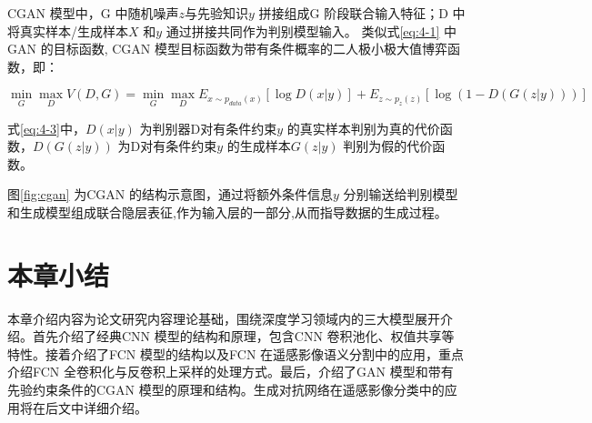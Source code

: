 CGAN 模型中，G 中随机噪声$z$与先验知识$y$ 拼接组成G 阶段联合输入特征；D 中将真实样本/生成样本$X$ 和$y$ 通过拼接共同作为判别模型输入。 类似式\ref{eq:4-1} 中GAN 的目标函数, CGAN 模型目标函数为带有条件概率的二人极小极大值博弈函数，即：

\begin{equation}
  \label{eq:4-3}
  \mathop{\min}_{G} \mathop{\max}_{D} V(D,G) = \mathop{\min}_{G} \mathop{\max}_{D} E_{x \sim p_{data}(x)} [\log D(x|y)] + E_{z \sim p_{z}(z)}[ \log (1-D(G(z|y)))]
\end{equation}

式\ref{eq:4-3}中，$D(x|y)$ 为判别器D对有条件约束$y$ 的真实样本判别为真的代价函数，$D(G(z|y))$ 为D对有条件约束$y$ 的生成样本$G(z|y)$ 判别为假的代价函数。

图\ref{fig:cgan} 为CGAN 的结构示意图，通过将额外条件信息$y$ 分别输送给判别模型和生成模型组成联合隐层表征,作为输入层的一部分,从而指导数据的生成过程。

\section{本章小结}
\label{sec:chap02-4}

本章介绍内容为论文研究内容理论基础，围绕深度学习领域内的三大模型展开介绍。首先介绍了经典CNN 模型的结构和原理，包含CNN 卷积池化、权值共享等特性。接着介绍了FCN 模型的结构以及FCN 在遥感影像语义分割中的应用，重点介绍FCN 全卷积化与反卷积上采样的处理方式。最后，介绍了GAN 模型和带有先验约束条件的CGAN 模型的原理和结构。生成对抗网络在遥感影像分类中的应用将在后文中详细介绍。